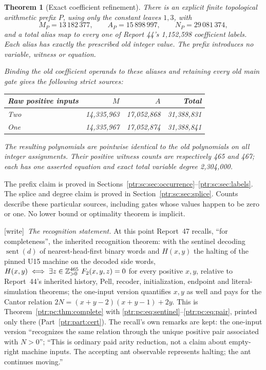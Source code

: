 \documentclass[11pt,letterpaper]{article}
\newtheorem{theorem}{Theorem}[section]
\theoremstyle{definition}\newtheorem{definition}[theorem]{Definition}
\theoremstyle{remark}\newtheorem{remark}[theorem]{Remark}
\newcommand{\wtag}{\textup{[write]}}
\begin{document}
\begin{theorem}[Exact coefficient refinement]\label{ptr:sc:thm:prefix}
There is an explicit finite topological arithmetic prefix $P$, using only the constant leaves $1,3$, with
\[
 M_P=13\,182\,377,\qquad A_P=15\,898\,997,\qquad N_P=29\,081\,374,
\]
and a total alias map to every one of Report 44's 1,152,598 coefficient labels. Each alias has exactly the prescribed old integer value. The prefix introduces no variable, witness or equation.

Binding the old coefficient operands to these aliases and retaining every old main gate gives the following strict sources:
\begin{center}
\begin{tabular}{@{}lrrr@{}}\toprule
Raw positive inputs & $M$ & $A$ & Total\\\midrule
Two &14,335,963&17,052,868&31,388,831\\
One &14,335,967&17,052,874&31,388,841\\\bottomrule
\end{tabular}\end{center}
The resulting polynomials are pointwise identical to the old polynomials on all integer assignments. Their positive witness counts are respectively 465 and 467; each has one asserted equation and exact total variable degree 2,304,000.
\end{theorem}
The prefix claim is proved in Sections~\ref{ptr:sc:sec:occurrence}--\ref{ptr:sc:sec:labels}. The splice and degree claim is proved in Section~\ref{ptr:sc:sec:splice}. Counts describe these particular sources, including gates whose values happen to be zero or one. No lower bound or optimality theorem is implicit.

\wtag\ \emph{The recognition statement.} At this point Report~47 recalls,
``for completeness'', the inherited recognition theorem: with the sentinel
decoding $\operatorname{sent}(d)$ of nearest-head-first binary words and
$H(x,y)$ the halting of the pinned U15 machine on the decoded side words,
$H(x,y)\iff\exists z\in\Zp^{465}\ F_2(x,y,z)=0$ for every positive $x,y$,
relative to Report~44's inherited history, Pell, recoder, initialization,
endpoint and literal-simulation theorems; the one-input version quantifies
$x,y$ as well and pays for the Cantor relation $2N=(x+y-2)(x+y-1)+2y$. This is
Theorem~\ref{ptr:pc:thm:complete} with \eqref{ptr:pc:eq:sentinel}--\eqref{ptr:pc:eq:pair},
printed only there (Part~\ref{ptr:part:cert}). The recall's own remarks are
kept: the one-input version ``recognizes the same relation through the unique
positive pair associated with $N>0$''; ``This is ordinary paid arity
reduction, not a claim about empty-right machine inputs. The accepting ant
observable represents halting; the ant continues moving.''
\end{document}
